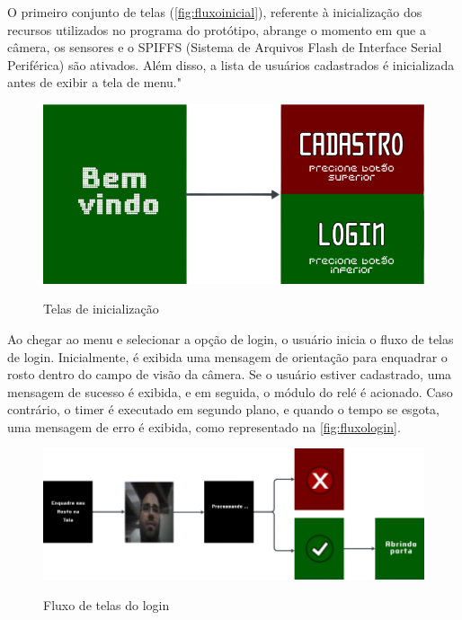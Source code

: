O primeiro conjunto de telas (\autoref{fig:fluxoinicial}), referente à 
inicialização dos recursos utilizados no programa do protótipo, 
abrange o momento em que a câmera, os sensores e o SPIFFS 
(Sistema de Arquivos Flash de Interface Serial Periférica) 
são ativados. Além disso, a lista de usuários cadastrados é 
inicializada antes de exibir a tela de menu." 

\begin{figure}[h!]
    \centering
    \caption{Telas de inicialização}
    \includegraphics[scale=0.25]{figuras/fluxo_inicial.png}
    \fonte{}%
    \label{fig:fluxoinicial}
    \centering
\end{figure}

Ao chegar ao menu e selecionar a opção de login, o usuário inicia o 
fluxo de telas de login. Inicialmente, é exibida uma mensagem de 
orientação para enquadrar o rosto dentro do campo de visão da câmera. 
Se o usuário estiver cadastrado, uma mensagem de sucesso é exibida, 
e em seguida, o módulo do relé é acionado. Caso contrário, o timer 
é executado em segundo plano, e quando o tempo se esgota, uma mensagem 
de erro é exibida, como representado na \autoref{fig:fluxologin}.

\begin{figure}[h!]
    \centering
    \caption{Fluxo de telas do login}
    \includegraphics[scale=2.1]{figuras/fluxo_login.png}
    \fonte{}%
    \label{fig:fluxologin}
    \centering
\end{figure}


